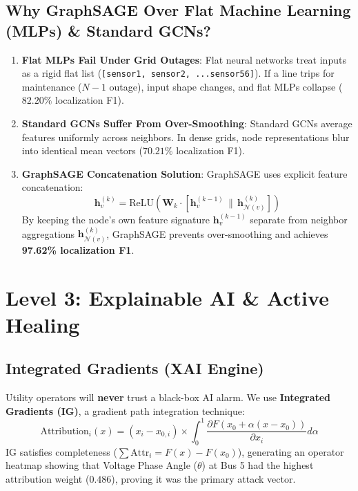 \documentclass[11pt,a4paper]{article}
\begin{document}
\subsection{Why GraphSAGE Over Flat Machine Learning (MLPs) \& Standard GCNs?}
\begin{enumerate}
    \item \textbf{Flat MLPs Fail Under Grid Outages}: Flat neural networks treat inputs as a rigid flat list (\texttt{[sensor1, sensor2, ...sensor56]}). If a line trips for maintenance ($N-1$ outage), input shape changes, and flat MLPs collapse ($82.20\%$ localization F1).
    \item \textbf{Standard GCNs Suffer From Over-Smoothing}: Standard GCNs average features uniformly across neighbors. In dense grids, node representations blur into identical mean vectors ($70.21\%$ localization F1).
    \item \textbf{GraphSAGE Concatenation Solution}: GraphSAGE uses explicit feature concatenation:
    \begin{equation}
    \mathbf{h}_v^{(k)} = \text{ReLU}\left(\mathbf{W}_k \cdot \left[\mathbf{h}_v^{(k-1)} \,\|\, \mathbf{h}_{\mathcal{N}(v)}^{(k)}\right]\right)
    \end{equation}
    By keeping the node's own feature signature $\mathbf{h}_v^{(k-1)}$ separate from neighbor aggregations $\mathbf{h}_{\mathcal{N}(v)}^{(k)}$, GraphSAGE prevents over-smoothing and achieves \textbf{97.62\% localization F1}.
\end{enumerate}

\section{Level 3: Explainable AI \& Active Healing}

\subsection{Integrated Gradients (XAI Engine)}
Utility operators will \textbf{never} trust a black-box AI alarm. We use \textbf{Integrated Gradients (IG)}, a gradient path integration technique:
\begin{equation}
\text{Attribution}_i(x) = (x_i - x_{0,i}) \times \int_{0}^{1} \frac{\partial F(x_0 + \alpha(x - x_0))}{\partial x_i} d\alpha
\end{equation}
IG satisfies completeness ($\sum \text{Attr}_i = F(x) - F(x_0)$), generating an operator heatmap showing that Voltage Phase Angle ($\theta$) at Bus 5 had the highest attribution weight ($0.486$), proving it was the primary attack vector.
\end{document}
